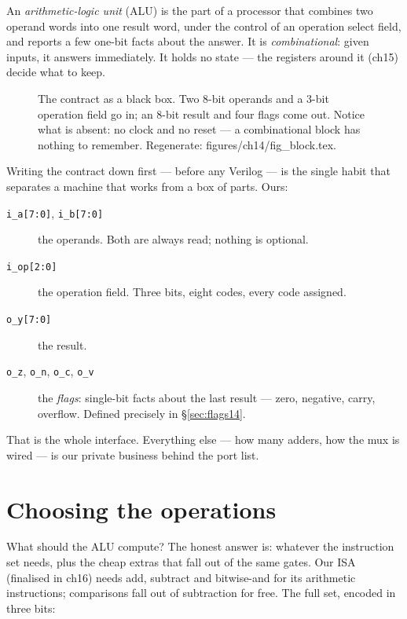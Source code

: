 An \emph{arithmetic-logic unit} (ALU) is the part of a processor that
combines two operand words into one result word, under the control of
an operation select field, and reports a few one-bit facts about the
answer. It is \emph{combinational}: given inputs, it answers
immediately. It holds no state --- the registers around it (ch15)
decide what to keep.

\begin{figure}[htbp]
\centering

\caption{The contract as a black box. Two 8-bit operands and a 3-bit
operation field go in; an 8-bit result and four flags come out. Notice
what is absent: no clock and no reset --- a combinational block has
nothing to remember. Regenerate: \ttfamily figures/ch14/fig\_block.tex.}
\label{fig:block14}
\end{figure}

Writing the contract down first --- before any Verilog --- is the
single habit that separates a machine that works from a box of parts.
Ours:

\begin{description}
\item[\texttt{i\_a[7:0]}, \texttt{i\_b[7:0]}] the operands. Both are
always read; nothing is optional.
\item[\texttt{i\_op[2:0]}] the operation field. Three bits, eight
codes, every code assigned.
\item[\texttt{o\_y[7:0]}] the result.
\item[\texttt{o\_z}, \texttt{o\_n}, \texttt{o\_c}, \texttt{o\_v}] the
\emph{flags}: single-bit facts about the last result ---
zero, negative, carry, overflow. Defined precisely in
\S\ref{sec:flags14}.
\end{description}

That is the whole interface. Everything else --- how many adders, how
the mux is wired --- is our private business behind the port list.

\section{Choosing the operations}\label{sec:opset14}

What should the ALU compute? The honest answer is: whatever the
instruction set needs, plus the cheap extras that fall out of the same
gates. Our ISA (finalised in ch16) needs add, subtract and
bitwise-and for its arithmetic instructions; comparisons fall out of
subtraction for free. The full set, encoded in three bits:

